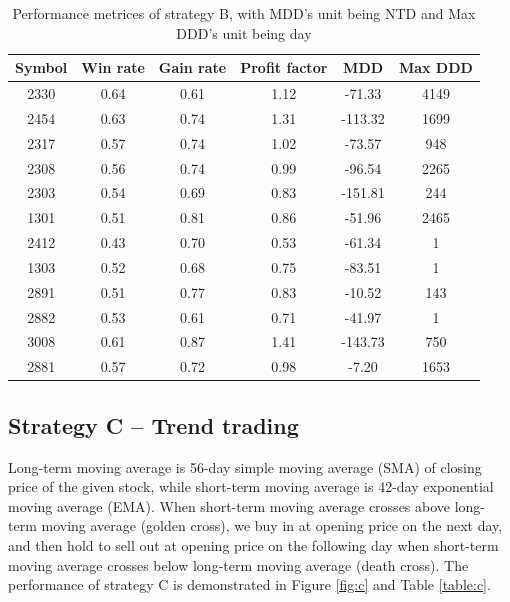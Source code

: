 \documentclass[12pt, letterpaper, oneside]{article}
\begin{document}
\begin{table}[h!]
    \centering
    \begin{tabular}{ |c|c|c|c|c|c| }
        \hline
        Symbol & Win rate & Gain rate & Profit factor & MDD & Max DDD \\ [0.5ex]
        \hline
        2330 & 0.64 & 0.61 & 1.12 & -71.33 & 4149 \\
        2454 & 0.63 & 0.74 & 1.31 & -113.32 & 1699 \\
        2317 & 0.57 & 0.74 & 1.02 & -73.57 & 948 \\
        2308 & 0.56 & 0.74 & 0.99 & -96.54 & 2265 \\
        2303 & 0.54 & 0.69 & 0.83 & -151.81 & 244 \\
        1301 & 0.51 & 0.81 & 0.86 & -51.96 & 2465 \\
        2412 & 0.43 & 0.70 & 0.53 & -61.34 & 1 \\
        1303 & 0.52 & 0.68 & 0.75 & -83.51 & 1 \\
        2891 & 0.51 & 0.77 & 0.83 & -10.52 & 143 \\
        2882 & 0.53 & 0.61 & 0.71 & -41.97 & 1 \\
        3008 & 0.61 & 0.87 & 1.41 & -143.73 & 750 \\
        2881 & 0.57 & 0.72 & 0.98 & -7.20 & 1653 \\ [0.5ex]
        \hline
    \end{tabular}
    \caption{Performance metrices of strategy B, with MDD's unit being NTD and Max DDD's unit being day}
    \label{table:b}
\end{table}

\subsection{Strategy C -- Trend trading}
Long-term moving average is 56-day simple moving average (SMA) of closing price of the given stock, while short-term moving average is 42-day exponential moving average (EMA). When short-term moving average crosses above long-term moving average (golden cross), we buy in at opening price on the next day, and then hold to sell out at opening price on the following day when short-term moving average crosses below long-term moving average (death cross). The performance of strategy C is demonstrated in Figure \ref{fig:c} and Table \ref{table:c}.
\end{document}
